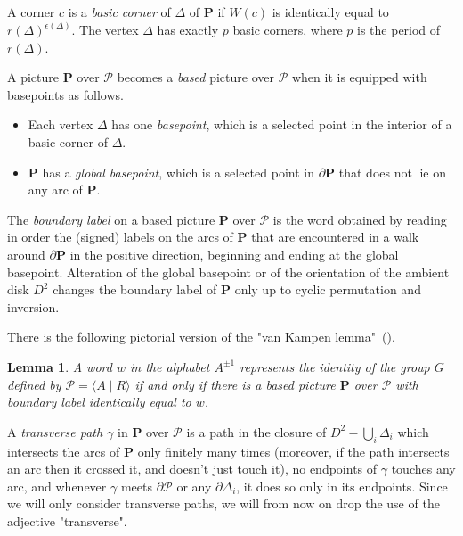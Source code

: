 \documentclass[12pt,reqno]{amsart}
\newtheorem{lem}{Lemma}
\begin{document}
A corner $c$ is a {\it basic corner} of $\Delta$ of $\mathbf{P}$ if $W(c)$ is identically equal to $r(\Delta)^{\epsilon(\Delta)}$.  The vertex $\Delta$ has exactly $p$ basic corners, where $p$ is the period of $r(\Delta)$.

A picture $\mathbf{P}$ over $\mathcal{P}$ becomes a {\it based} picture over $\mathcal{P}$ when it is equipped with basepoints as follows.


\begin{itemize}
\item Each vertex $\Delta$ has one {\it basepoint}, which is a selected point in the interior of a basic corner of $\Delta$.

\item $\mathbf{P}$ has a {\it global basepoint}, which is a selected point in $\partial \mathbf{P}$ that does not lie on any arc of $\mathbf{P}$.

\end{itemize}


The {\it boundary label} on a based picture $\mathbf{P}$ over $\mathcal{P}$ is the word %
obtained by reading in order the (signed) labels on the arcs of $\mathbf{P}$ that are encountered in a walk around $\partial \mathbf{P}$ in the positive direction, beginning and ending at the global basepoint. Alteration of the global basepoint or of the orientation of the ambient disk $D^2$ changes the boundary label of $\mathbf{P}$ only up to cyclic permutation and inversion.

There is the following pictorial version of the "van Kampen lemma"\, (\cite{lind}).



\begin{lem}\label{lemVKampen} A word $w$ in the alphabet $A^{\pm 1}$ represents the identity of the group $G$ defined by $\mathcal{P} = \langle A\mid R\rangle$ if and only if there is a based picture $\mathbf{P}$ over $\mathcal{P}$ with boundary label identically equal to $w$.
\end{lem}

A {\it transverse path $\gamma$} in $\mathbf{P}$ over $\mathcal{P}$ is a path in the closure of $D^2-\bigcup_i \Delta_i$ which intersects the arcs of $\mathbf{P}$ only finitely many times (moreover, if the path intersects an arc then it crossed it, and doesn't just touch it), no endpoints of $\gamma$ touches any arc, and whenever $\gamma$ meets  $\partial\mathcal{P}$ or any $\partial\Delta_i$, it does so only in its endpoints. Since we will only consider transverse paths, we will from now on drop the use of the adjective "transverse".
\end{document}
